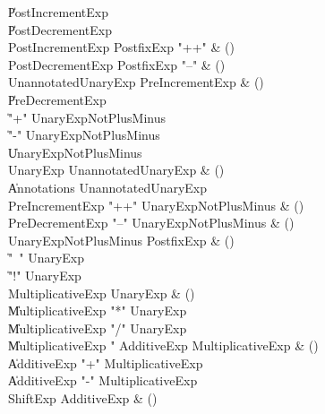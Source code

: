 \begin{bbgrammar}

    \| PostIncrementExp\\
    \| PostDecrementExp\\
 PostIncrementExp  \label{prod:PostIncrementExp}  \: PostfixExp \xcd"++" & ()\\
 PostDecrementExp  \label{prod:PostDecrementExp}  \: PostfixExp \xcd"--" & ()\\
 UnannotatedUnaryExp  \label{prod:UnannotatedUnaryExp}  \: PreIncrementExp & ()\\
    \| PreDecrementExp\\
    \| \xcd"+" UnaryExpNotPlusMinus\\
    \| \xcd"-" UnaryExpNotPlusMinus\\
    \| UnaryExpNotPlusMinus\\
 UnaryExp  \label{prod:UnaryExp}  \: UnannotatedUnaryExp & ()\\
    \| Annotations UnannotatedUnaryExp\\
 PreIncrementExp  \label{prod:PreIncrementExp}  \: \xcd"++" UnaryExpNotPlusMinus & ()\\
 PreDecrementExp  \label{prod:PreDecrementExp}  \: \xcd"--" UnaryExpNotPlusMinus & ()\\
 UnaryExpNotPlusMinus  \label{prod:UnaryExpNotPlusMinus}  \: PostfixExp & ()\\
    \| \xcd"~" UnaryExp\\
    \| \xcd"!" UnaryExp\\
 MultiplicativeExp  \label{prod:MultiplicativeExp}  \: UnaryExp & ()\\
    \| MultiplicativeExp \xcd"*" UnaryExp\\
    \| MultiplicativeExp \xcd"/" UnaryExp\\
    \| MultiplicativeExp \xcd"%
 AdditiveExp  \label{prod:AdditiveExp}  \: MultiplicativeExp & ()\\
    \| AdditiveExp \xcd"+" MultiplicativeExp\\
    \| AdditiveExp \xcd"-" MultiplicativeExp\\
 ShiftExp  \label{prod:ShiftExp}  \: AdditiveExp & ()\\

\end{bbgrammar}
